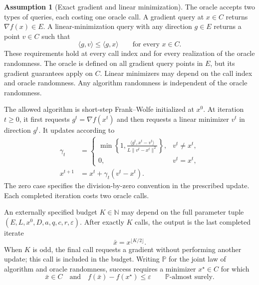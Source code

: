 \documentclass[10pt]{article}
\theoremstyle{definition}
\newtheorem{assumption}{Assumption}
\begin{document}
\begin{assumption}[Exact gradient and linear minimization]
The oracle accepts two types of queries, each costing one oracle call. A gradient query at $x\in C$ returns $\nabla f(x)\in E$. A linear-minimization query with any direction $g\in E$ returns a point $v\in C$ such that
\[
\langle g,v\rangle\leq\langle g,x\rangle
\qquad\text{for every }x\in C.
\]
These requirements hold at every call index and for every realization of the oracle randomness. The oracle is defined on all gradient query points in $E$, but its gradient guarantees apply on $C$. Linear minimizers may depend on the call index and oracle randomness. Any algorithm randomness is independent of the oracle randomness.
\end{assumption}

The allowed algorithm is short-step Frank--Wolfe initialized at $x^0$. At iteration $t\geq0$, it first requests $g^t=\nabla f(x^t)$ and then requests a linear minimizer $v^t$ in direction $g^t$. It updates according to
\begin{align*}
\gamma_t&=
\begin{cases}
\displaystyle\min\left\{1,\frac{\langle g^t,x^t-v^t\rangle}
{L\|v^t-x^t\|^2}\right\},&v^t\ne x^t,\\
0,&v^t=x^t,
\end{cases}\\
x^{t+1}&=x^t+\gamma_t(v^t-x^t).
\end{align*}
The zero case specifies the division-by-zero convention in the prescribed update. Each completed iteration costs two oracle calls.

An externally specified budget $K\in\mathbb{N}$ may depend on the full parameter tuple $(E,L,x^0,D,a,q,c,r,\varepsilon)$. After exactly $K$ calls, the output is the last completed iterate
\[
\bar{x}=x^{\lfloor K/2\rfloor}.
\]
When $K$ is odd, the final call requests a gradient without performing another update; this call is included in the budget. Writing $\mathbb{P}$ for the joint law of algorithm and oracle randomness, success requires a minimizer $x^\star\in C$ for which
\[
\bar{x}\in C
\quad\text{and}\quad
f(\bar{x})-f(x^\star)\leq\varepsilon
\qquad\mathbb{P}\text{-almost surely}.
\]
\end{document}
